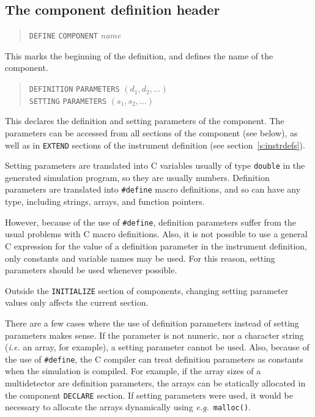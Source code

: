 

\subsection{The component definition header}
\label{s:comp-header}

\begin{quote}
  \texttt{DEFINE} \texttt{COMPONENT} \textit{name}
\end{quote}
This marks the beginning of the definition, and defines the name of the
component.
\begin{quote}
  \texttt{DEFINITION} \texttt{PARAMETERS} $(d_1, d_2, \ldots)$ \\
  \texttt{SETTING} \texttt{PARAMETERS} $(s_1, s_2, \ldots)$
\end{quote}
This declares the definition and setting parameters of the component.
The parameters can be
accessed from all sections of the component (see below),
as well as in \verb+EXTEND+ sections of the instrument definition (see section~\ref{s:instrdefs}).

Setting parameters are translated into C variables usually of type
\verb+double+ in the generated simulation program, so they are usually
numbers. Definition parameters are translated into \verb+#define+ macro
definitions, and so can have any type, including strings, arrays, and
function pointers.

However, because of the use of \verb+#define+, definition parameters
suffer from the usual problems with C macro definitions. Also, it is not
possible to use a general C expression for the value of a definition
parameter in the instrument definition, only constants and variable
names may be used. For this reason, setting parameters should be used
whenever possible.

Outside the \verb+INITIALIZE+ section of components, changing setting parameter values only affects the current section.

There are a few cases where the use of definition parameters instead of
setting parameters makes sense. If the parameter is not numeric, nor a character string ({\em i.e.} an
array, for example), a setting parameter cannot be
used. Also, because of the use of \verb+#define+, the C compiler can
treat definition parameters as constants when the simulation is
compiled. For example, if the array sizes of a multidetector are
definition parameters, the arrays can be statically allocated in the
component \verb+DECLARE+ section. If setting parameters were used, it
would be necessary to allocate the arrays dynamically using {\em e.g.}\
\verb+malloc()+.

